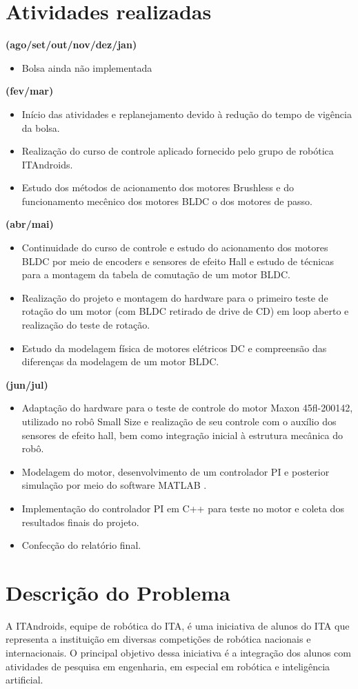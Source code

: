 \documentclass[a4paper,11pt]{article}
\begin{document}
	\section{Atividades realizadas}
	\textbf{(ago/set/out/nov/dez/jan)}
	\begin{itemize}
		\item Bolsa ainda não implementada
	\end{itemize}
	\textbf{(fev/mar)}
	\begin{itemize}
		\item Início das atividades e replanejamento devido à redução do tempo de vigência da bolsa.
		\item Realização do curso de controle aplicado fornecido pelo grupo de robótica ITAndroids.
		\item Estudo dos métodos de acionamento dos motores Brushless e do funcionamento mecênico dos motores BLDC o dos motores de passo.
	\end{itemize}
		\textbf{(abr/mai)}
	\begin{itemize}
		\item Continuidade do curso de controle e estudo do acionamento dos motores BLDC por meio de encoders e sensores de efeito Hall e estudo de técnicas para a montagem da tabela de comutação de um motor BLDC.
		\item Realização do projeto e montagem do hardware para o primeiro teste de rotação do um motor (com BLDC retirado de drive de CD) em loop aberto e realização do teste de rotação.
		\item Estudo da modelagem física de motores elétricos DC e compreensão das diferenças da modelagem de um motor BLDC.
	\end{itemize}
		\textbf{(jun/jul)}
		\begin{itemize}
			\item Adaptação do hardware para o teste de controle do motor Maxon 45fl-200142, utilizado no robô Small Size e realização de seu controle com o auxílio dos sensores de efeito hall, bem como integração inicial à estrutura mecânica do robô.
			\item Modelagem do motor, desenvolvimento de um controlador PI e posterior simulação por meio do software MATLAB \cite{MATLAB}.
			\item Implementação do controlador PI em C++ para teste no motor e coleta dos resultados finais do projeto.
			\item Confecção do relatório final.
		\end{itemize}
	\section{Descrição do Problema}
		A ITAndroids, equipe de robótica do ITA, é uma iniciativa de alunos do ITA que representa a instituição em diversas competições de robótica nacionais e internacionais. O principal objetivo dessa iniciativa é a integração dos alunos com atividades de pesquisa em engenharia, em especial em robótica e inteligência artificial.
		
\end{document}
